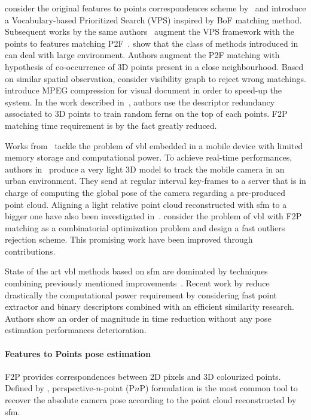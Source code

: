			\citet{Sattler2011} consider the original features to points correspondences scheme by~\citep{Irschara2009} and introduce a Vocabulary-based Prioritized Search (VPS) inspired by BoF matching method. Subsequent works by the same authors~\citep{Sattler2012} augment the VPS framework with the points to features matching P2F~\citep{Li2010}. \citet{Li2012} show that the class of methods introduced in~\citep{Irschara2009,Li2010} can deal with large environment. Authors augment the P2F matching with hypothesis of co-occurrence of 3D points present in a close neighbourhood. Based on similar spatial observation, \citet{Sattler2015} consider visibility graph to reject wrong matchings. \citet{Heisterklaus2014} introduce MPEG compression for visual document in order to speed-up the system. In the work described in~\citep{Donoser2014}, authors use the descriptor redundancy associated to 3D points to train random ferns on the top of each points. F2P matching time requirement is by the fact greatly reduced. 
			
			Works from~\citep{Middelberg2014,Lynen2015} tackle the problem of \ac{vbl} embedded in a mobile device with limited memory storage and computational power. To achieve real-time performances, authors in~\citep{Middelberg2014} produce a very light 3D model to track the mobile camera in an urban environment. They send at regular interval key-frames to a server that is in charge of computing the global pose of the camera regarding a pre-produced point cloud. Aligning a light relative point cloud reconstructed with \ac{sfm} to a bigger one have also been investigated in~\citep{Lu2015}. \citet{Svarm2014} consider the problem of \ac{vbl} with F2P matching as a combinatorial optimization problem and design a fast outliers rejection scheme. This promising work have been improved through~\citep{Zeisl2015,Svarm2016} contributions.
			
			State of the art \ac{vbl} methods based on \ac{sfm} are dominated by techniques combining previously mentioned improvements~\citep{Sattler2016a}. Recent work by \citet{Feng2016a} reduce drastically the computational power requirement by considering fast point extractor and binary descriptors combined with an efficient similarity research. Authors show an order of magnitude in time reduction without any pose estimation performances deterioration.
		
		\paragraph{Features to Points pose estimation}
			F2P provides correspondences between 2D pixels and 3D colourized points. Defined by \citet{Hartley2003}, perspective-$n$-point (P$n$P) formulation is the most common tool to recover the absolute camera pose according to the point cloud reconstructed by \ac{sfm}.
			
